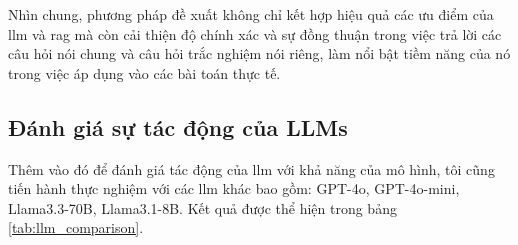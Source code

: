 Nhìn chung, phương pháp đề xuất không chỉ kết hợp hiệu quả các ưu điểm của \gls{llm} và \gls{rag} mà còn cải thiện độ chính xác và sự đồng thuận trong việc trả lời các câu hỏi nói chung và câu hỏi trắc nghiệm nói riêng, làm nổi bật tiềm năng của nó trong việc áp dụng vào các bài toán thực tế.




\subsection{Đánh giá sự tác động của LLMs}
Thêm vào đó để đánh giá tác động của \gls{llm} với khả năng của mô hình, tôi cũng tiến hành thực nghiệm với các \gls{llm} khác bao gồm:
GPT-4o, GPT-4o-mini, Llama3.3-70B, Llama3.1-8B. Kết quả được thể hiện trong bảng \ref{tab:llm_comparison}.
\begin{table}[ht]
    \centering
    \caption{So sánh hiệu suất giữa câu trả lời trực tiếp và phương pháp đề xuất với các mô hình khác nhau. Các giá trị trong ngoặc đơn biểu thị phần trăm cải thiện.}

    \label{tab:llm_comparison}
\end{table}
